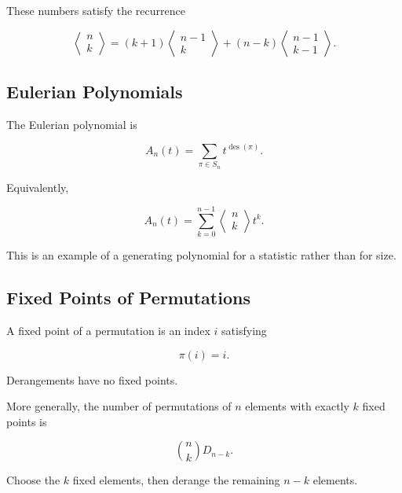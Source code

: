 These numbers satisfy the recurrence

\[
\boxed{
\left\langle
\begin{matrix}
n\\
k
\end{matrix}
\right\rangle
=
(k+1)
\left\langle
\begin{matrix}
n-1\\
k
\end{matrix}
\right\rangle
+
(n-k)
\left\langle
\begin{matrix}
n-1\\
k-1
\end{matrix}
\right\rangle.
}
\]

\subsection{Eulerian Polynomials}
\label{subsec:eulerian-polynomials}

The Eulerian polynomial is

\[
\boxed{
A_n(t)
=
\sum_{\pi\in S_n}
t^{\operatorname{des}(\pi)}.
}
\]

Equivalently,

\[
A_n(t)
=
\sum_{k=0}^{n-1}
\left\langle
\begin{matrix}
n\\
k
\end{matrix}
\right\rangle
t^k.
\]

This is an example of a generating polynomial for a statistic rather
than for size.

\subsection{Fixed Points of Permutations}
\label{subsec:fixed-points-permutations}

A fixed point of a permutation is an index \(i\) satisfying

\[
\pi(i)=i.
\]

Derangements have no fixed points.

More generally, the number of permutations of \(n\) elements with
exactly \(k\) fixed points is

\[
\boxed{
\binom{n}{k}D_{n-k}.
}
\]

Choose the \(k\) fixed elements, then derange the remaining \(n-k\)
elements.

